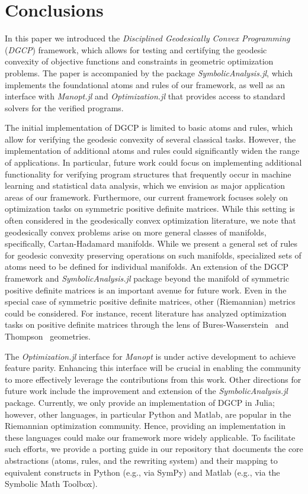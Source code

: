 \documentclass[twoside,11pt]{article}
\begin{document}
\newpage
\section{Conclusions}
In this paper we introduced the \emph{Disciplined Geodesically Convex Programming} (\emph{DGCP}) framework, which allows for testing and certifying the geodesic convexity of objective functions and constraints in geometric optimization problems. The paper is accompanied by the package \textsl{SymbolicAnalysis.jl}, which implements the foundational atoms and rules of our framework, as well as an interface with \textsl{Manopt.jl} and \textsl{Optimization.jl} that provides access to standard solvers for the verified programs.

The initial implementation of DGCP is limited to basic atoms and rules, which allow for verifying the geodesic convexity of several classical tasks. However, the implementation of additional atoms and rules could significantly widen the range of applications. In particular, future work could focus on implementing additional functionality for verifying program structures that frequently occur in machine learning and statistical data analysis, which we envision as major application areas of our framework. Furthermore, our current framework focuses solely on optimization tasks on symmetric positive definite matrices. While this setting is often considered in the geodesically convex optimization literature, we note that geodesically convex problems arise on more general classes of manifolds, specifically, Cartan-Hadamard manifolds. While we present a general set of rules for geodesic convexity preserving operations on such manifolds, specialized sets of atoms need to be defined for individual manifolds. An extension of the DGCP framework and \textsl{SymbolicAnalysis.jl} package beyond the manifold of symmetric positive definite matrices is an important avenue for future work. Even in the special case of symmetric positive definite matrices, other (Riemannian) metrics could be considered. For instance, recent literature has analyzed optimization tasks on positive definite matrices through the lens of Bures-Wasserstein~\citep{chewi2020gradient} and Thompson~\citep{thompson} geometries. 

The \textsl{Optimization.jl} interface for \textsl{Manopt} is under active development to achieve feature parity. Enhancing this interface will be crucial in enabling the community to more effectively leverage the contributions from this work. Other directions for future work include the improvement and extension of the \textsl{SymbolicAnalysis.jl} package. Currently, we only provide an implementation of DGCP in Julia; however, other languages, in particular Python and Matlab, are popular in the Riemannian optimization community. Hence, providing an implementation in these languages could make our framework more widely applicable. To facilitate such efforts, we provide a porting guide in our repository that documents the core abstractions (atoms, rules, and the rewriting system) and their mapping to equivalent constructs in Python (e.g., via SymPy) and Matlab (e.g., via the Symbolic Math Toolbox).
\end{document}
